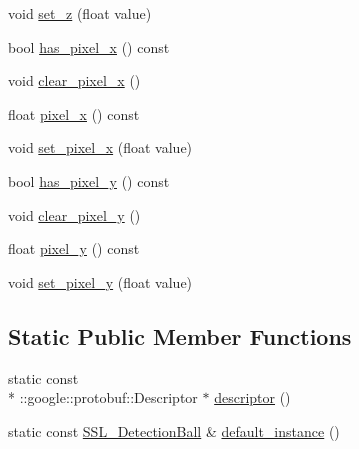 \begin{DoxyCompactItemize}
void \hyperlink{class_s_s_l___detection_ball_a7fda6234fd82a73ac6362d75f44652f9}{set\-\_\-z} (float value)
\item 
bool \hyperlink{class_s_s_l___detection_ball_a6f118f6ae12d19f6becc2b17cc942778}{has\-\_\-pixel\-\_\-x} () const 
\item 
void \hyperlink{class_s_s_l___detection_ball_a4a2ca6dce67d47a61fb62ef3e7c5f055}{clear\-\_\-pixel\-\_\-x} ()
\item 
float \hyperlink{class_s_s_l___detection_ball_adca6a93e1fc8b76c5880dc84ae81fc59}{pixel\-\_\-x} () const 
\item 
void \hyperlink{class_s_s_l___detection_ball_a9ed07f330acd80c400d222c0fe5c2f43}{set\-\_\-pixel\-\_\-x} (float value)
\item 
bool \hyperlink{class_s_s_l___detection_ball_a15574df9db6fa5fc4a8f29d03b875709}{has\-\_\-pixel\-\_\-y} () const 
\item 
void \hyperlink{class_s_s_l___detection_ball_a9f4bc87faf746ca801a16fcc3d1aff4b}{clear\-\_\-pixel\-\_\-y} ()
\item 
float \hyperlink{class_s_s_l___detection_ball_a19d57c389cd80299a74b9b3edbe95a4f}{pixel\-\_\-y} () const 
\item 
void \hyperlink{class_s_s_l___detection_ball_aaefb3e3bbcd21b2e5a9595ff71bd4421}{set\-\_\-pixel\-\_\-y} (float value)
\end{DoxyCompactItemize}
\subsection*{Static Public Member Functions}
\begin{DoxyCompactItemize}
\item 
static const \\*
\-::google\-::protobuf\-::\-Descriptor $\ast$ \hyperlink{class_s_s_l___detection_ball_a51a081379cf388f407721319240cda2b}{descriptor} ()
\item 
static const \hyperlink{class_s_s_l___detection_ball}{S\-S\-L\-\_\-\-Detection\-Ball} \& \hyperlink{class_s_s_l___detection_ball_a3cead83f2e0d6d9a6b528d89f9036108}{default\-\_\-instance} ()
\end{DoxyCompactItemize}
